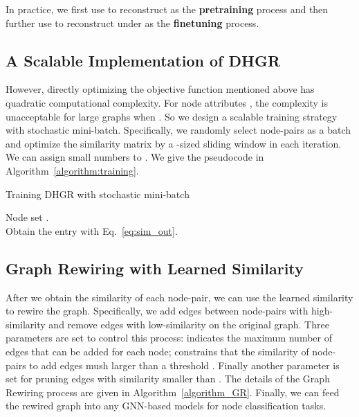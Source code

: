 \documentclass[sigconf]{acmart}
\begin{document}
	
	In practice, we first use  to reconstruct  as the \textbf{pretraining} process and then further use  to reconstruct  under  as the \textbf{finetuning} process. 
	\subsection{A Scalable Implementation of DHGR}
	However, directly optimizing the objective function mentioned above has quadratic computational complexity. For node attributes , the  complexity is unacceptable for large graphs when . So we design a scalable training strategy with stochastic mini-batch. Specifically, we randomly select  node-pairs as a batch and optimize the similarity matrix  by a -sized sliding window in each iteration. We can assign small numbers to . We give the pseudocode in Algorithm~\ref{algorithm:training}.
	
	\begin{algorithm}
		\caption{Training DHGR with stochastic mini-batch}
		\label{algorithm:training}
		\LinesNumbered
		Node set  .\\
		Obtain the entry  with Eq.~\ref{eq:sim_out}. 
	\end{algorithm}
	

	\subsection{Graph Rewiring with Learned Similarity}
	
	
	After we obtain the similarity of each node-pair, we can use the learned similarity  to rewire the graph. Specifically, we add edges between node-pairs with high-similarity and remove edges with low-similarity on the original graph. Three parameters are set to control this process:  indicates the maximum number of edges that can be added for each node;  constrains that the similarity of node-pairs to add edges mush larger than a threshold .  Finally another parameter  is set for pruning edges with similarity smaller than . The details of the Graph Rewiring process are given in Algorithm~\ref{algorithm_GR}. Finally, we can feed the rewired graph  into any GNN-based models for node classification tasks.
	
\end{document}

